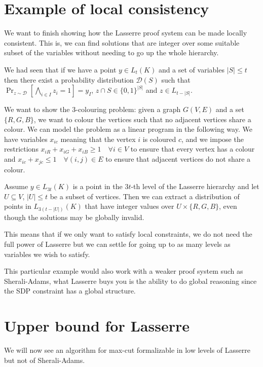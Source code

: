 \documentclass[a4paper,twoside,justified]{tufte-handout}
\begin{document}
 

\section{Example of local consistency}

We want to finish showing how the Lasserre proof system can be made locally consistent. This is, we can find solutions that are integer over some suitable subset of the variables without needing to go up the whole hierarchy.

We had seen that if we have a point $y\in L_t(K)$ and a set of variables $|S| \leq t$ then there exist a probability distribution $\mathcal{D}(S)$ such that $\Pr_{z \sim \mathcal{D}} [ \bigwedge_{i \in I} z_i =1 ] = y_I$, $z \cap S \in \{0,1\}^{|S|}$ and $z \in L_{t - |S|}$.

We want to show the 3-colouring problem: given a graph $G(V,E)$ and a set $\{R,G,B\}$, we want to colour the vertices such that no adjacent vertices share a colour. We can model the problem as a linear program in the following way. We have variables $x_{ic}$ meaning that the vertex $i$ is coloured $c$, and we impose the restrictions $x_{iR}+x_{iG}+x_{iB} \geq 1 \quad \forall i\in V$ to ensure that every vertex has a colour and $x_{ic} + x_{jc} \leq 1 \quad \forall (i,j) \in E$ to ensure that adjacent vertices do not share a colour.

Assume $y \in L_{3t}(K)$ is a point in the $3t$-th level of the Lasserre hierarchy and let $U \subseteq V$, $|U| \leq t$ be a subset of vertices. Then we can extract a distribution of points in $L_{3(t-|U|)}(K)$ that have integer values over $U \times \{R,G,B\}$, even though the solutions may be globally invalid.

This means that if we only want to satisfy local constraints, we do not need the full power of Lasserre but we can settle for going up to as many levels as variables we wish to satisfy.

This particular example would also work with a weaker proof system such as Sherali-Adams, what Lasserre buys you is the ability to do global reasoning since the SDP constraint has a global structure.

\section{Upper bound for Lasserre}

We will now see an algorithm for max-cut formalizable in low levels of Lasserre but not of Sherali-Adams.
\end{document}
